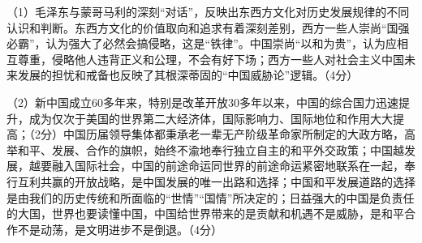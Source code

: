 \documentclass[UTF8,11pt]{ctexart}
\begin{document}
（1）毛泽东与蒙哥马利的深刻“对话”，反映出东西方文化对历史发展规律的不同认识和判断。东西方文化的价值取向和追求有着深刻差别，西方一些人崇尚“国强必霸”，认为强大了必然会搞侵略，这是“铁律”。中国崇尚“以和为贵”，认为应相互尊重，侵略他人违背正义和公理，不会有好下场；西方一些人对社会主义中国未来发展的担忧和戒备也反映了其根深蒂固的“中国威胁论”逻辑。（4分）


（2）新中国成立60多年来，特别是改革开放30多年以来，中国的综合国力迅速提升，成为仅次于美国的世界第二大经济体，国际影响力、国际地位和作用大大提高；（2分）中国历届领导集体都秉承老一辈无产阶级革命家所制定的大政方略，高举和平、发展、合作的旗帜，始终不渝地奉行独立自主的和平外交政策；中国越发展，越要融入国际社会，中国的前途命运同世界的前途命运紧密地联系在一起，奉行互利共赢的开放战略，是中国发展的唯一出路和选择；中国和平发展道路的选择是由我们的历史传统和所面临的“世情”“国情”所决定的；日益强大的中国是负责任的大国，世界也要读懂中国，中国给世界带来的是贡献和机遇不是威胁，是和平合作不是动荡，是文明进步不是倒退。（4分）
\end{document}
